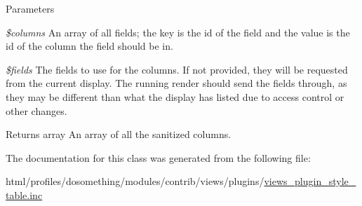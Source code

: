 \begin{DoxyParams}{Parameters}
\item[{\em \$columns}]An array of all fields; the key is the id of the field and the value is the id of the column the field should be in. \item[{\em \$fields}]The fields to use for the columns. If not provided, they will be requested from the current display. The running render should send the fields through, as they may be different than what the display has listed due to access control or other changes.\end{DoxyParams}
\begin{DoxyReturn}{Returns}
array An array of all the sanitized columns. 
\end{DoxyReturn}


The documentation for this class was generated from the following file:\begin{DoxyCompactItemize}
\item 
html/profiles/dosomething/modules/contrib/views/plugins/\hyperlink{views__plugin__style__table_8inc}{views\_\-plugin\_\-style\_\-table.inc}\end{DoxyCompactItemize}
